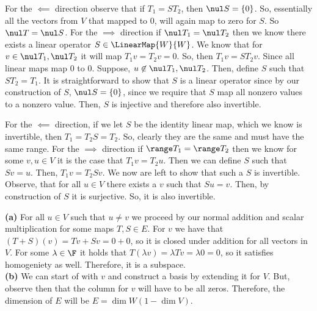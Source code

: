 \begin{q}[4]
    For the $ \impliedby $ direction observe that if $ T_1 = ST_2 $, then $ \nul S = \{0\} $. So, essentially all the vectors from $ V $ that mapped to 0, will again map to zero for $ S $.
    So $ \nul T = \nul S $. 
    For the $ \implies $ direction if $ \nul T_1 = \nul T_2 $ then we know there exists a linear operator $ S \in \LinearMap{W}{W} $. 
    We know that for $ v \in \nul T_1, \nul T_2 $ it will map $ T_1v = T_2 v = 0 $. So, then $ T_1 v = ST_2 v $. 
    Since all linear maps map 0 to 0. 
    Suppose, $ u \not \in \nul T_1, \nul T_2 $. Then, define $ S $ such that $ ST_2 = T_1 $.  
    It is straightforward to show that $ S $ is a linear operator since by our construction of $ S $, $ \nul S = \{0\} $, since we require that $ S $ map all nonzero values to a nonzero value. 
    Then, $ S $ is injective and therefore also invertible.
\end{q}
\begin{q}[5]
    For the $ \impliedby $ direction, if we let $ S $ be the identity linear map, which we know is invertible, then $ T_1 = T_2S = T_2 $. So, clearly they are the same and must have the same range.
    For the $ \implies $ direction if $ \range T_1 = \range T_2 $ then we know for some $ v, u \in V $ it is the case that $ T_1v = T_2u $. 
    Then we can define $ S $ such that $ Sv = u $. 
    Then, $ T_1v = T_2Sv $. 
    We now are left to show that such a $ S $ is invertible. 
    Observe, that for all $ u \in V $ there exists a $ v $ such that $ Su = v $. Then, by construction of $ S $ it is surjective. 
    So, it is also invertible.
\end{q}
\begin{q}[7]
    \textbf{(a)}
    For all $ u \in V $ such that $ u \neq v $ we proceed by our normal addition and scalar multiplication for some maps $ T, S \in E $. 
    For $ v $ we have that $ (T+S)(v) = Tv + Sv = 0 + 0 $, so it is closed under addition for all vectors in $ V $. 
    For some $ \lambda \in \F $ it holds that $ T(\lambda v) = \lambda Tv  = \lambda 0 = 0 $, so it satisfies homogeniety as well. Therefore, it is a subspace. \\
    \textbf{(b)} 
    We can start of with $ v $ and construct a basis by extending it for $ V $. 
    But, observe then that the column for $ v $ will have to be all zeros. 
    Therefore, the dimension of $ E $ will be $ E = \dim W (1 - \dim V) $. 
\end{q}
